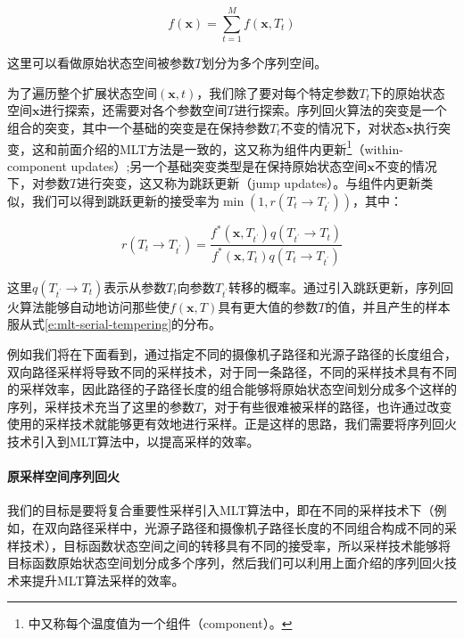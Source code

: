 \begin{equation}\label{e:mlt-serial-tempering}
	f(\mathbf{x})=\sum^{M}_{t=1}f(\mathbf{x},T_t)
\end{equation}

\noindent 这里可以看做原始状态空间被参数$T$划分为多个序列空间。

为了遍历整个扩展状态空间$(\mathbf{x},t)$，我们除了要对每个特定参数$T_t$下的原始状态空间$\mathbf{x}$进行探索，还需要对各个参数空间$T$进行探索。序列回火算法的突变是一个组合的突变，其中一个基础的突变是在保持参数$T_t$不变的情况下，对状态$\mathbf{x}$执行突变，这和前面介绍的MLT方法是一致的，这又称为组件内更新\footnote{\cite{b:HandbookofMarkovChainMonteCarlo}中又称每个温度值为一个组件（component）。}（within-component updates）;另一个基础突变类型是在保持原始状态空间$\mathbf{x}$不变的情况下，对参数$T$进行突变，这又称为跳跃更新（jump updates）。与组件内更新类似，我们可以得到跳跃更新的接受率为$\min(1,r(T_t\to T_{t^{'}}))$，其中：

\begin{equation}
	r(T_t\to T_{t^{'}})=\frac{f^{*}(\mathbf{x},T_{t^{'}})q(T_{t^{'}}\to T_t)}{f^{*}(\mathbf{x},T_t)q(T_t\to T_{t^{'}})}
\end{equation}

\noindent 这里$q(T_{t^{'}}\to T_t)$表示从参数$T_t$向参数$T_{t^{'}}$转移的概率。通过引入跳跃更新，序列回火算法能够自动地访问那些使$f(\mathbf{x},T)$具有更大值的参数$T$的值，并且产生的样本服从式\ref{e:mlt-serial-tempering}的分布。

例如我们将在下面看到，通过指定不同的摄像机子路径和光源子路径的长度组合，双向路径采样将导致不同的采样技术，对于同一条路径，不同的采样技术具有不同的采样效率，因此路径的子路径长度的组合能够将原始状态空间划分成多个这样的序列，采样技术充当了这里的参数$T$，对于有些很难被采样的路径，也许通过改变使用的采样技术就能够更有效地进行采样。正是这样的思路，我们需要将序列回火技术引入到MLT算法中，以提高采样的效率。




\paragraph{原采样空间序列回火}
我们的目标是要将复合重要性采样引入MLT算法中，即在不同的采样技术下（例如，在双向路径采样中，光源子路径和摄像机子路径长度的不同组合构成不同的采样技术），目标函数状态空间之间的转移具有不同的接受率，所以采样技术能够将目标函数原始状态空间划分成多个序列，然后我们可以利用上面介绍的序列回火技术来提升MLT算法采样的效率。

